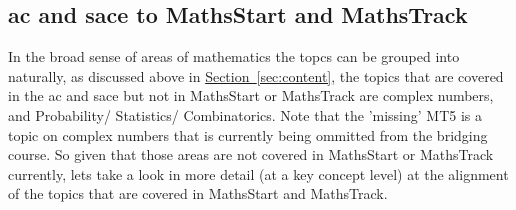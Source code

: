 \documentclass[twoside,12pt,a4paper]{report}
\newcommand{\refsec}[1]{\hyperref[sec:#1]{Section~\ref{sec:#1}}}
\begin{document}
\subsection{\gls{ac} and \gls{sace} to MathsStart and MathsTrack}

In the broad sense of areas of mathematics the topcs can be grouped into naturally, as discussed above in \refsec{content}, the topics that are covered in the \gls{ac} and \gls{sace} but not in MathsStart or MathsTrack are complex numbers, and Probability/ Statistics/ Combinatorics. Note that the 'missing' MT5 is a topic on complex numbers that is currently being ommitted from the bridging course. So given that those areas are not covered in MathsStart or MathsTrack currently, lets take a look in more detail (at a key concept level) at the alignment of the topics that are covered in MathsStart and MathsTrack.
\end{document}
